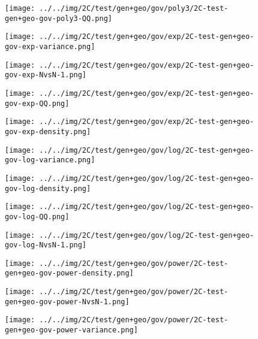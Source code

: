 \begin{figure}[H]
\centering	\texttt{[image: ../../img/2C/test/gen+geo/gov/poly3/2C-test-gen+geo-gov-poly3-QQ.png]}
\end{figure}
\begin{figure}[H]
\centering	\texttt{[image: ../../img/2C/test/gen+geo/gov/exp/2C-test-gen+geo-gov-exp-variance.png]}
\end{figure}
\begin{figure}[H]
\centering	\texttt{[image: ../../img/2C/test/gen+geo/gov/exp/2C-test-gen+geo-gov-exp-NvsN-1.png]}
\end{figure}
\begin{figure}[H]
\centering	\texttt{[image: ../../img/2C/test/gen+geo/gov/exp/2C-test-gen+geo-gov-exp-QQ.png]}
\end{figure}
\begin{figure}[H]
\centering	\texttt{[image: ../../img/2C/test/gen+geo/gov/exp/2C-test-gen+geo-gov-exp-density.png]}
\end{figure}
\begin{figure}[H]
\centering	\texttt{[image: ../../img/2C/test/gen+geo/gov/log/2C-test-gen+geo-gov-log-variance.png]}
\end{figure}
\begin{figure}[H]
\centering	\texttt{[image: ../../img/2C/test/gen+geo/gov/log/2C-test-gen+geo-gov-log-density.png]}
\end{figure}
\begin{figure}[H]
\centering	\texttt{[image: ../../img/2C/test/gen+geo/gov/log/2C-test-gen+geo-gov-log-QQ.png]}
\end{figure}
\begin{figure}[H]
\centering	\texttt{[image: ../../img/2C/test/gen+geo/gov/log/2C-test-gen+geo-gov-log-NvsN-1.png]}
\end{figure}
\begin{figure}[H]
\centering	\texttt{[image: ../../img/2C/test/gen+geo/gov/power/2C-test-gen+geo-gov-power-density.png]}
\end{figure}
\begin{figure}[H]
\centering	\texttt{[image: ../../img/2C/test/gen+geo/gov/power/2C-test-gen+geo-gov-power-NvsN-1.png]}
\end{figure}
\begin{figure}[H]
\centering	\texttt{[image: ../../img/2C/test/gen+geo/gov/power/2C-test-gen+geo-gov-power-variance.png]}
\end{figure}
